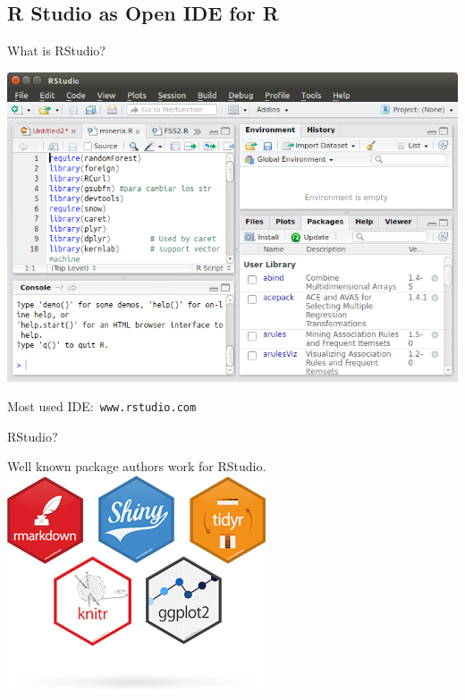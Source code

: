 \documentclass{beamer}
\begin{document}
\subsection[R Studio]{R Studio as Open IDE for R}


\begin{frame}{What is RStudio?} %

\centering
\includegraphics[height=.50\textwidth]{figs/RStudio.png}

Most used IDE:\texttt{ www.rstudio.com}

\end{frame}


\begin{frame}{RStudio?} %

\centering
Well known package authors work for RStudio.
\includegraphics[height=.60\textwidth]{figs/r-packages.png}


\end{frame}
\end{document}
